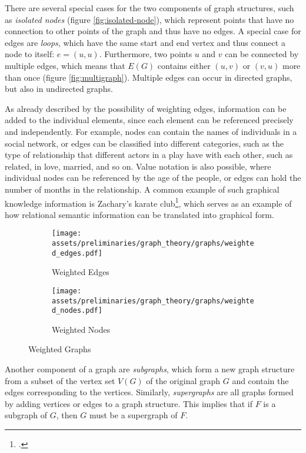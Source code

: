 \documentclass[a4paper, 12pt]{report}
\begin{document}
There are several special cases for the two components of graph structures, such as \textit{isolated nodes} (figure \ref{fig:isolated-node}), which represent points that have no connection to other points of the graph and thus have no edges. A special case for edges are \textit{loops}, which have the same start and end vertex and thus connect a node to itself: $e = (u, u)$. Furthermore, two points $u$ and $v$ can be connected by multiple edges, which means that $E(G)$ contains either $(u, v)$ or $(v, u)$ more than once (figure \ref{fig:multigraph}). Multiple edges can occur in directed graphs, but also in undirected graphs.

As already described by the possibility of weighting edges, information can be added to the individual elements, since each element can be referenced precisely and independently. For example, nodes can contain the names of individuals in a social network, or edges can be classified into different categories, such as the type of relationship that different actors in a play have with each other, such as related, in love, married, and so on. Value notation is also possible, where individual nodes can be referenced by the age of the people, or edges can hold the number of months in the relationship. A common example of such graphical knowledge information is Zachary's karate club\footcite{sanchez2021gentle}, which serves as an example of how relational semantic information can be translated into graphical form.

\begin{figure}
\centering
\begin{subfigure}{.5\textwidth}
\centering
\texttt{[image: assets/preliminaries/graph\_theory/graphs/weighted\_edges.pdf]}
\caption{Weighted Edges}
\label{fig:weighted-edges}
\end{subfigure}%
\begin{subfigure}{.5\textwidth}
\centering
\texttt{[image: assets/preliminaries/graph\_theory/graphs/weighted\_nodes.pdf]}
\caption{Weighted Nodes}
\label{fig:weighted-nodes}
\end{subfigure}
\caption{Weighted Graphs}
\label{fig:weighted-graphs}
\end{figure}

Another component of a graph are \textit{subgraphs}, which form a new graph structure from a subset of the vertex set $V(G)$ of the original graph $G$ and contain the edges corresponding to the vertices. Similarly, \textit{supergraphs} are all graphs formed by adding vertices or edges to a graph structure. This implies that if $F$ is a subgraph of $G$, then $G$ must be a supergraph of $F$.
\end{document}
